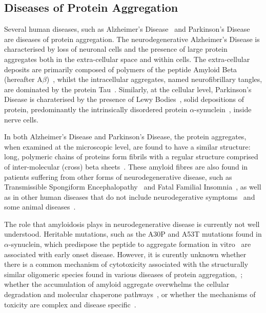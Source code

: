 \subsection{Diseases of Protein Aggregation}
Several human diseases, such as Alzheimer's Disease~\cite{ueda1993} and Parkinson's Disease~\cite{spillantini1997} are diseases of protein aggregation. The neurodegenerative Alzheimer's Disease is characterised by loss of neuronal cells and the presence of large protein aggregates both in the extra-cellular space and within cells. The extra-cellular deposits are primarily composed of polymers of the peptide Amyloid Beta (hereafter A${\beta}$)~\cite{Noe2004}, whilst the intracellular aggregates, named neurofibrillary tangles, are dominated by the protein Tau~\cite{goedert1989}. Similarly, at the cellular level, Parkinson's Disease is charaterised by the presence of Lewy Bodies~\cite{Gibb1988}, solid depositions of protein, predominantly the intrinsically disordered protein $\alpha$-synuclein~\cite{spillantini1997}, inside nerve cells.


In both Alzheimer's Disease and Parkinson's Disease, the protein aggregates, when examined at the microscopic level, are found to have a similar structure: long, polymeric chains of proteins form fibrils with a regular structure comprised of inter-molecular (cross) beta sheets~\cite{Serpell2000}. These amyloid fibres are also found in patients suffering from other forms of neurodegenerative disease, such as Transmissible Spongiform Encephalopathy~\cite{Wells1987} and Fatal Familial Insomnia~\cite{Goldfarb1992}, as well as in other human diseases that do not include neurodegerative symptoms~\cite{Clark1988} and some animal diseases~\cite{Safar1993}. 


The role that amyloidosis plays in neurodegenerative disease is currently not well understood. Heritable mutations, such as the A30P and A53T mutations found in $\alpha$-synuclein, which predispose the peptide to aggregate formation in vitro~\cite{Conway1999} are associated with early onset disease. However, it is curently unknown whether there is a common mechanism of cytotoxicity associated with the structurally similar oligomeric species found in various diseases of protein aggregation,~\cite{Haas2007}; whether the accumulation of amyloid aggregate overwhelms the cellular degradation and molecular chaperone pathways~\cite{Muchowski2005}, or whether the mechanisms of toxicity are complex and disease specific~\cite{Benilova2012}.      

